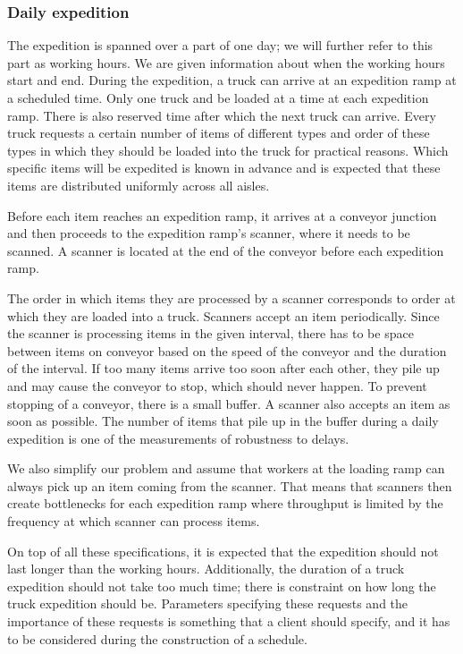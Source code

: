 \documentclass{ctuthesis}
\begin{document}
\subsubsection{Daily expedition}
The expedition is spanned over a part of one day; we will further refer to this part as working hours. We are given information about when the working hours start and end. During the expedition, a truck can arrive at an expedition ramp at a scheduled time. Only one truck and be loaded at a time at each expedition ramp. There is also reserved time after which the next truck can arrive. Every truck requests a certain number of items of different types and order of these types in which they should be loaded into the truck for practical reasons. Which specific items will be expedited is known in advance and is expected that these items are distributed uniformly across all aisles. 

Before each item reaches an expedition ramp, it arrives at a conveyor junction and then proceeds to the expedition ramp's scanner, where it needs to be scanned. A scanner is located at the end of the conveyor before each expedition ramp. 

The order in which items they are processed by a scanner corresponds to order at which they are loaded into a truck. Scanners accept an item periodically. Since the scanner is processing items in the given interval, there has to be space between items on conveyor based on the speed of the conveyor and the duration of the interval. If too many items arrive too soon after each other, they pile up and may cause the conveyor to stop, which should never happen. To prevent stopping of a conveyor, there is a small buffer. A scanner also accepts an item as soon as possible. The number of items that pile up in the buffer during a daily expedition is one of the measurements of robustness to delays.

We also simplify our problem and assume that workers at the loading ramp can always pick up an item coming from the scanner. That means that scanners then create bottlenecks for each expedition ramp where throughput is limited by the frequency at which scanner can process items.

On top of all these specifications, it is expected that the expedition should not last longer than the working hours. Additionally, the duration of a truck expedition should not take too much time; there is constraint on how long the truck expedition should be. Parameters specifying these requests and the importance of these requests is something that a client should specify, and it has to be considered during the construction of a schedule.
\end{document}
